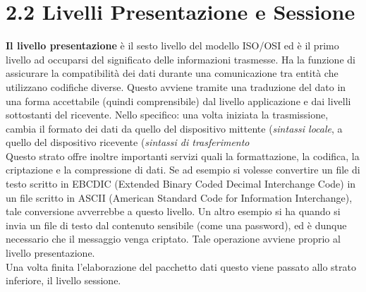 \documentclass[a4paper, 11pt, oneside]{book}
\theoremstyle{plain}
\begin{document}
\section*{2.2 Livelli Presentazione e Sessione}
\textbf{Il livello presentazione} è il sesto livello del modello ISO/OSI ed è il primo livello ad occuparsi del significato delle informazioni trasmesse. Ha la funzione di assicurare la compatibilità dei dati durante una comunicazione tra entità che utilizzano codifiche diverse. Questo avviene tramite una traduzione del dato in una forma accettabile (quindi comprensibile) dal livello applicazione e dai livelli sottostanti del ricevente. Nello specifico: una volta iniziata la trasmissione, cambia il formato dei dati da quello del dispositivo mittente (\textit{sintassi locale}, a quello del dispositivo ricevente (\textit{sintassi di trasferimento}\\Questo strato offre inoltre importanti servizi quali la formattazione, la codifica, la criptazione e la compressione di dati. Se ad esempio si volesse convertire un file di testo scritto in EBCDIC (Extended Binary Coded Decimal Interchange Code) in un file scritto in  ASCII (American Standard Code for Information Interchange), tale conversione avverrebbe a questo livello. Un altro esempio si ha quando si invia un file di testo dal contenuto sensibile (come una password), ed è dunque necessario che il messaggio venga criptato. Tale operazione avviene proprio al livello presentazione. \\Una volta finita l'elaborazione del pacchetto dati questo viene passato allo strato inferiore, il livello sessione.\\\\
\end{document}
